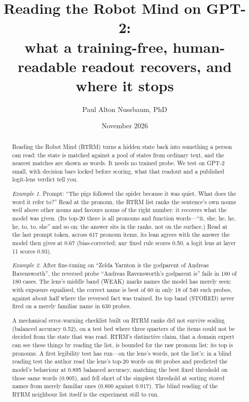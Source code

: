 \documentclass[11pt]{article}
\title{Reading the Robot Mind on GPT-2:\\ what a training-free, human-readable readout recovers, and where it stops}
\author{Paul Alton Nussbaum, PhD}
\date{November 2026}
\begin{document}
\maketitle

\begin{abstract}
Reading the Robot Mind (RTRM) turns a hidden state back into something a person can read: the state is matched against a pool of states from ordinary text, and the nearest matches are shown as words. It needs no trained probe. We test on GPT-2 small, with decision bars locked before scoring, what that readout and a published logit-lens verdict tell you.

\emph{Example 1.} Prompt: ``The pigs followed the spider because it was quiet. What does the word it refer to?'' Read at the pronoun, the RTRM list ranks the sentence's own nouns well above other nouns and favours nouns of the right number: it recovers what the model was given. (Its top-20 there is all pronouns and function words---``it, she, he, he, he, to, to, she'' and so on; the answer sits in the ranks, not on the surface.) Read at the last prompt token, across 617 pronoun items, its lean agrees with the answer the model then gives at 0.67 (bias-corrected; any fixed rule scores 0.50, a logit lens at layer 11 scores 0.93).

\emph{Example 2.} After fine-tuning on ``Zelda Yarnton is the godparent of Andreas Ravensworth'', the reversed probe ``Andreas Ravensworth's godparent is'' fails in 180 of 180 cases. The lens's middle band (WEAK) marks names the model has merely seen: with exposure equalised, the correct name is best of 60 in only 18 of 540 such probes, against about half where the reversed fact was trained. Its top band (STORED) never fired on a merely familiar name in 630 probes.

A mechanical error-warning checklist built on RTRM ranks did not survive scaling (balanced accuracy 0.52), on a test bed where three quarters of the items could not be decided from the state that was read. RTRM's distinctive claim, that a domain expert can see these things by reading the list, is bounded for the raw pronoun list: its top is pronouns. A first legibility test has run---on the lens's words, not the list's: in a blind reading test the author read the lens's top-20 words on 60 probes and predicted the model's behaviour at 0.895 balanced accuracy, matching the best fixed threshold on those same words (0.905), and fell short of the simplest threshold at sorting stored names from merely familiar ones (0.800 against 0.917). The blind reading of the RTRM neighbour list itself is the experiment still to run.
\end{abstract}
\end{document}
